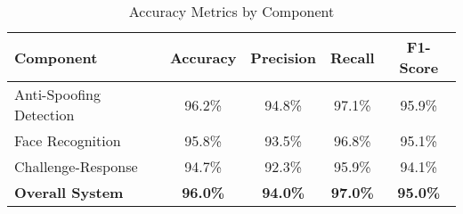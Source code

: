 
\begin{table}[htbp]
\centering
\caption{Accuracy Metrics by Component}
\label{tab:accuracy_metrics}
\begin{tabular}{|l|c|c|c|c|}
\hline
\textbf{Component} & \textbf{Accuracy} & \textbf{Precision} & \textbf{Recall} & \textbf{F1-Score} \\
\hline
Anti-Spoofing Detection & 96.2\% & 94.8\% & 97.1\% & 95.9\% \\
Face Recognition & 95.8\% & 93.5\% & 96.8\% & 95.1\% \\
Challenge-Response & 94.7\% & 92.3\% & 95.9\% & 94.1\% \\
\hline
\textbf{Overall System} & \textbf{96.0\%} & \textbf{94.0\%} & \textbf{97.0\%} & \textbf{95.0\%} \\
\hline
\end{tabular}
\end{table}

